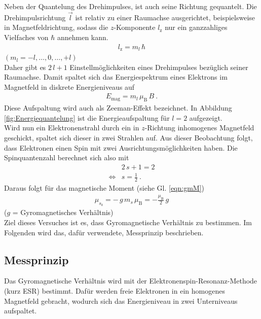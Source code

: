 Neben der Quantelung des Drehimpulses, ist auch seine Richtung gequantelt. Die Drehimpulsrichtung $\vec{l}$ ist relativ zu einer Raumachse ausgerichtet, beispielsweise in Magnetfeldrichtung, sodass die $z$-Komponente $l_\text{z}$ nur ein ganzzahliges Vielfaches von $\hbar$ annehmen kann.
\begin{align}
	l_\text{z} = m_l\, \hbar
\end{align}
\hspace{1.9cm} \footnotesize{$(m_l = -l, \dots, 0, \dots, +l)$} \vspace{0.25cm}\\
Daher gibt es $2\,l + 1$ Einstellmöglichkeiten eines Drehimpulses bezüglich seiner Raumachse. Damit spaltet sich das Energiespektrum eines Elektrons im Magnetfeld in diskrete Energieniveaus auf
\begin{align}
	E_\text{mag} = m_l\, \mu_\text{B}\, B \ .
\end{align}
Diese Aufspaltung wird auch als Zeeman-Effekt bezeichnet. In Abbildung \eqref{fig:Energiequantelung} ist die Energieaufspaltung für $l = 2$ aufgezeigt. \\
Wird nun ein Elektronenstrahl durch ein in $z$-Richtung inhomogenes Magnetfeld geschickt, spaltet sich dieser in zwei Strahlen auf. Aus dieser Beobachtung folgt, dass Elektronen einen Spin mit zwei Ausrichtungsmöglichkeiten haben. Die Spinquantenzahl berechnet sich also mit
\begin{align*}
	&2\, s + 1 = 2 \\
	\Leftrightarrow &s = \frac{1}{2} \ .
\end{align*}
Daraus folgt für das magnetische Moment (siehe Gl. \eqref{eqn:gmM})
\begin{align*}
	\mu_{s_\text{z}} = -\,g \,m_s \,\mu_\text{B} = -\frac{\mu_\text{B}}{2}\, g
\end{align*}
\hfill \footnotesize{($g$ = Gyromagnetisches Verhältnis)} \hfill \vspace{0.25cm}\\
Ziel dieses Versuches ist es, dass Gyromagnetische Verhältnis zu bestimmen. Im Folgenden wird das, dafür verwendete, Messprinzip beschrieben.



\subsection{Messprinzip}
Das Gyromagnetische Verhältnis wird mit der Elektronenspin-Resonanz-Methode (kurz ESR) bestimmt. Dafür werden freie Elektronen in ein homogenes Magnetfeld gebracht, wodurch sich das Energieniveau in zwei Unterniveaus aufspaltet.

